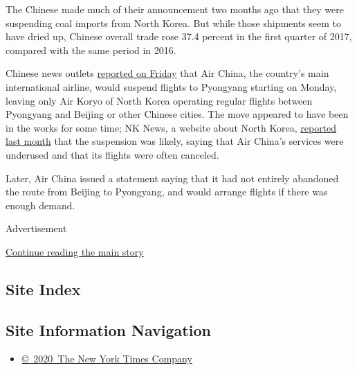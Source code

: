 The Chinese made much of their announcement two months ago that they
were suspending coal imports from North Korea. But while those shipments
seem to have dried up, Chinese overall trade rose 37.4 percent in the
first quarter of 2017, compared with the same period in 2016.

Chinese news outlets
\href{http://news.163.com/17/0414/19/CI0OMCIA0001875O.html}{reported on
Friday} that Air China, the country's main international airline, would
suspend flights to Pyongyang starting on Monday, leaving only Air Koryo
of North Korea operating regular flights between Pyongyang and Beijing
or other Chinese cities. The move appeared to have been in the works for
some time; NK News, a website about North Korea,
\href{https://www.nknews.org/2017/03/air-china-to-cancel-2017-north-korea-service-following-marathon/}{reported
last month} that the suspension was likely, saying that Air China's
services were underused and that its flights were often canceled.

Later, Air China issued a statement saying that it had not entirely
abandoned the route from Beijing to Pyongyang, and would arrange flights
if there was enough demand.

Advertisement

\protect\hyperlink{after-bottom}{Continue reading the main story}

\hypertarget{site-index}{%
\subsection{Site Index}\label{site-index}}

\hypertarget{site-information-navigation}{%
\subsection{Site Information
Navigation}\label{site-information-navigation}}

\begin{itemize}
\tightlist
\item
  \href{https://help.nytimes.com/hc/en-us/articles/115014792127-Copyright-notice}{©~2020~The
  New York Times Company}
\end{itemize}

